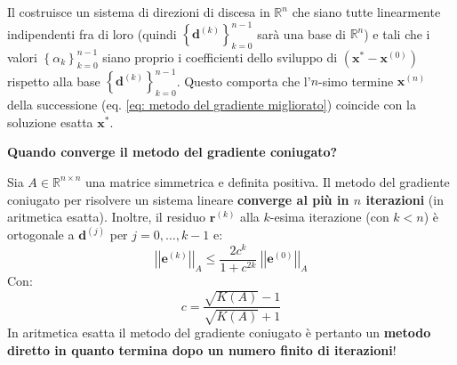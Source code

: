 \highspace
Il  costruisce un sistema di direzioni di discesa in $\mathbb{R}^{n}$ che siano tutte linearmente indipendenti fra di loro (quindi $\left\{\mathbf{d}^{\left(k\right)}\right\}_{k=0}^{n-1}$ sarà una base di $\mathbb{R}^{n}$) e tali che i valori $\left\{\alpha_{k}\right\}_{k=0}^{n-1}$ siano proprio i coefficienti dello sviluppo di $\left(\mathbf{x}^{*} - \mathbf{x}^{\left(0\right)}\right)$ rispetto alla base $\left\{\mathbf{d}^{\left(k\right)}\right\}_{k=0}^{n-1}$. Questo comporta che l'$n$-simo termine $\mathbf{x}^{\left(n\right)}$ della successione (eq. \ref{eq: metodo del gradiente migliorato}) coincide con la soluzione esatta $\mathbf{x}^{*}$.

\highspace
\begin{flushleft}
    \textcolor{Green3}{ \textbf{Quando converge il metodo del gradiente coniugato?}}
\end{flushleft}
Sia $A \in \mathbb{R}^{n \times n}$ una matrice simmetrica e definita positiva. Il metodo del gradiente coniugato per risolvere un sistema lineare \textbf{converge al più in $n$ iterazioni} (in aritmetica esatta). Inoltre, il residuo $\mathbf{r}^{\left(k\right)}$ alla $k$-esima iterazione (con $k < n$) è ortogonale a $\mathbf{d}^{\left(j\right)}$ per $j = 0, \dots, k-1$ e:
\begin{equation}
    \left|\left| \mathbf{e}^{\left(k\right)} \right|\right|_{A} \le \dfrac{2c^{k}}{1+c^{2k}} \: \left|\left| \mathbf{e}^{\left(0\right)} \right|\right|_{A}
\end{equation}
Con:
\begin{equation}
    c = \dfrac{
        \sqrt{K\left(A\right)}-1
    }{
        \sqrt{K\left(A\right)}+1
    }
\end{equation}
In aritmetica esatta il metodo del gradiente coniugato è pertanto un \textbf{metodo diretto in quanto termina dopo un numero finito di iterazioni}!

